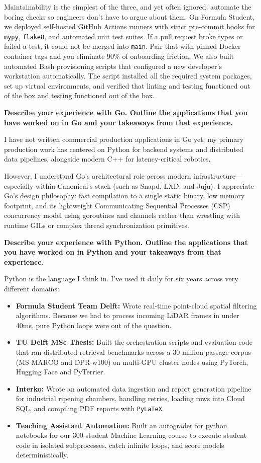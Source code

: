 \documentclass[letterpaper,11pt]{article}
\newcommand{\interviewQuestion}[1]{%
  \vspace{8pt}%
  \textbf{\color{airforceblue}#1}\par%
}
\begin{document}
Maintainability is the simplest of the three, and yet often ignored: automate the boring checks so engineers don't have to argue about them. On Formula Student, we deployed self-hosted GitHub Actions runners with strict pre-commit hooks for \texttt{mypy}, \texttt{flake8}, and automated unit test suites. If a pull request broke types or failed a test, it could not be merged into \texttt{main}. Pair that with pinned Docker container tags and you eliminate 90\% of onboarding friction. We also built automated Bash provisioning scripts that configured a new developer's workstation automatically. The script installed all the required system packages, set up virtual environments, and verified that linting and testing functioned out of the box and testing functioned out of the box.

\interviewQuestion{Describe your experience with Go. Outline the applications that you have worked on in Go and your takeaways from that experience.}

I have not written commercial production applications in Go yet; my primary production work has centered on Python for backend systems and distributed data pipelines, alongside modern C++ for latency-critical robotics.

However, I understand Go's architectural role across modern infrastructure—especially within Canonical's stack (such as Snapd, LXD, and Juju). I appreciate Go's design philosophy: fast compilation to a single static binary, low memory footprint, and its lightweight Communicating Sequential Processes (CSP) concurrency model using goroutines and channels rather than wrestling with runtime GILs or complex thread synchronization primitives.


\interviewQuestion{Describe your experience with Python. Outline the applications that you have worked on in Python and your takeaways from that experience.}

Python is the language I think in. I've used it daily for six years across very different domains:

\begin{itemize}[leftmargin=0.2in, itemsep=3pt]
    \item \textbf{Formula Student Team Delft:} Wrote real-time point-cloud spatial filtering algorithms. Because we had to process incoming LiDAR frames in under 40ms, pure Python loops were out of the question.
    \item \textbf{TU Delft MSc Thesis:} Built the orchestration scripts and evaluation code that ran distributed retrieval benchmarks across a 30-million passage corpus (MS MARCO and DPR-w100) on multi-GPU cluster nodes using PyTorch, Hugging Face and PyTerrier.
    \item \textbf{Interko:} Wrote an automated data ingestion and report generation pipeline for industrial ripening chambers, handling retries, loading rows into Cloud SQL, and compiling PDF reports with \texttt{PyLaTeX}.
    \item \textbf{Teaching Assistant Automation:} Built an autograder for python notebooks for our 300-student Machine Learning course to execute student code in isolated subprocesses, catch infinite loops, and score models deterministically.
\end{itemize}
\end{document}
